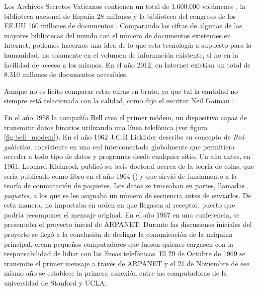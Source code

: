 Los Archivos Secretos Vaticanos contienen un total de 1.600.000 volúmenes \cite{Bav15}, la biblioteca nacional de España 28 millones \cite{Sanz15} y la biblioteca del congreso de los \ac{EE.UU} 160 millones de documentos \cite{Libr15}. Comparando las cifras de algunas de las mayores bibliotecas del mundo con el número de documentos existentes en Internet, podemos hacernos una idea de lo que esta tecnología a supuesto para la humanidad, no solamente en el volumen de información existente, si no en la facilidad de acceso a los mismos. En el año 2012, en Internet existían un total de 8.310 millones de documentos accesibles.

Aunque no es lícito comparar estas cifras en bruto, ya que tal la cantidad no siempre está relacionada con la calidad, como dijo el escritor Neil Gaiman \cite{Gaim10}:

\vspace{5mm}
\vspace{5mm}

En el año 1958 la compañía Bell crea el primer módem, un dispositivo capaz de transmitir datos binarios utilizando una línea telefónica (ver figura \ref{fig:bell_modem}). En el año 1962 J.C.R Licklider describe su concepto de \textit{Red galáctica}, consistente en una red interconectada globalmente que permitiera acceder a todo tipo de datos y programas desde cualquier sitio. Un año antes, en 1961, Leonard Kleinrock publicó su tesis doctoral acerca de la teoría de colas, que sería publicado como libro en el año 1964 (\cite{Klei64}) y que sirvió de fundamento a la teoría de conmutación de paquetes. Los datos se troceaban en partes, llamadas \textit{paquetes}, a los que se les asignaba un número de secuencia antes de enviarlos. De esta manera, no importaba en orden en que llegasen al receptor, puesto que podría recomponer el mensaje original.
En el año 1967 en una conferencia, se presentaba el proyecto inicial de \ac{ARPANET}. Durante las discusiones iniciales del proyecto se llegó a la conclusión de desligar la comunicación de la máquina principal, crean pequeños computadores que fuesen quienes cargasen con la responsabilidad de lidiar con las líneas telefónicas. El 29 de Octubre de 1969 se transmite el primer mensaje a través de \ac{ARPANET} y el 21 de Noviembre de ese mismo año se establece la primera conexión entre las computadoras de la universidad de Stanford y \ac{UCLA}. 

